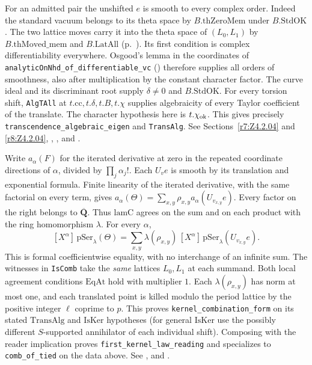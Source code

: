For an admitted pair the unshifted $e$ is smooth to every complex
order. Indeed the standard vacuum belongs to its theta space by
$B.\mathrm{thZeroMem}$ under $B.\mathrm{StdOK}$. The two lattice moves
carry it into the theta space of $(L_0,L_1)$ by
$B.\mathrm{thMoved\_mem}$ and $B.\mathrm{LatAll}$
(p.~\pageref{r14:lat-indices}). Its first condition is complex
differentiability everywhere. Osgood's lemma in the coordinates of
\nolinkurl{analyticOnNhd_of_differentiable_vc}
() therefore supplies
all orders of smoothness, also after multiplication by the constant
character factor.
The curve ideal and its discriminant root supply $\delta\ne 0$ and
$B.\mathrm{StdOK}$. For every torsion shift, \nolinkurl{AlgTAll} at
$t.\mathrm{cc},t.\delta,t.B,t.\chi$ supplies algebraicity of every
Taylor coefficient of the translate. The character hypothesis here is
$t.\chi_{\rm ok}$. This gives precisely \nolinkurl{transcendence_algebraic_eigen}
and \nolinkurl{TransAlg}. See Sections~\ref{r7:Z4.2.04} and
\ref{r8:Z4.2.04}, ,
,
 and
.

Write $a_\alpha(F)$ for the iterated derivative at zero in the repeated
coordinate directions of $\alpha$, divided by $\prod_j\alpha_j!$.
Each $U_v e$ is smooth by its translation and exponential formula.
Finite linearity of the iterated derivative, with the same factorial on
every term, gives $a_\alpha(\Theta)=\sum_{x,y}\rho_{x,y}
a_\alpha(U_{v_{x,y}}e)$. Every factor on the right belongs to
$\overline{\mathbf Q}$. Thus $\mathrm{lamC}$ agrees on the sum and on
each product with the ring homomorphism $\lambda$. For every $\alpha$,
\[
 [X^\alpha]\,\mathrm{pSer}_\lambda(\Theta)=
   \sum_{x,y}\lambda(\rho_{x,y})\,
   [X^\alpha]\,\mathrm{pSer}_\lambda(U_{v_{x,y}}e).
\]
This is formal coefficientwise equality, with no interchange of an
infinite sum. The witnesses in \nolinkurl{IsComb} take the \emph{same}
lattices $L_0,L_1$ at each summand. Both local agreement conditions
$\mathrm{EqAt}$ hold with multiplier $1$. Each $\lambda(\rho_{x,y})$
has norm at most one, and each translated point is killed modulo the
period lattice by the positive integer $\ell$ coprime to $p$.
This proves \nolinkurl{kernel_combination_form} on its stated
$\mathrm{TransAlg}$ and $\mathrm{IsKer}$ hypotheses (for general
$\mathrm{IsKer}$ use the possibly different $S$-supported annihilator
of each individual shift). Composing with the reader implication proves
\nolinkurl{first_kernel_law_reading} and specializes to
\nolinkurl{comb_of_tied} on the data above. See
,
 and
.


